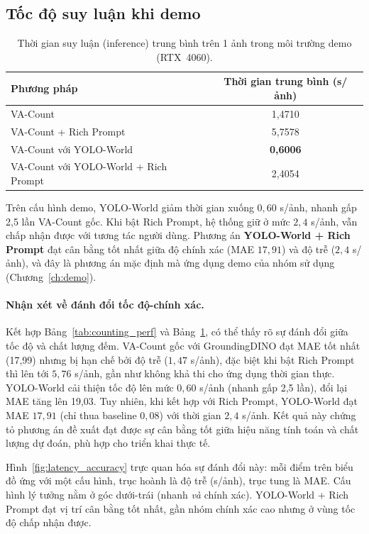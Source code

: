 \documentclass[a4paper,12pt]{report}
\numberwithin{figure}{chapter}
\numberwithin{table}{chapter}
\begin{document}
\subsection{Tốc độ suy luận khi demo}

\begin{table}[H]
\centering
\renewcommand{\arraystretch}{1.2}
\begin{tabular}{|l|c|}
\hline
\rowcolor[HTML]{EFEFEF}
\textbf{Phương pháp} & \textbf{Thời gian trung bình (s/ảnh)} \\
\hline
VA-Count & 1,4710 \\
\hline
VA-Count + Rich Prompt & 5,7578 \\
\hline
VA-Count với YOLO-World & \textbf{0,6006} \\
\hline
VA-Count với YOLO-World + Rich Prompt & 2,4054 \\
\hline
\end{tabular}
\caption{Thời gian suy luận (inference) trung bình trên 1 ảnh trong môi trường demo (RTX~4060).}
\label{tab:demo_time}
\end{table}

Trên cấu hình demo, YOLO-World giảm thời gian xuống $0{,}60$ s/ảnh, nhanh gấp 2,5 lần VA-Count gốc. Khi bật Rich Prompt, hệ thống giữ ở mức $2{,}4$ s/ảnh, vẫn chấp nhận được với tương tác người dùng. Phương án \textbf{YOLO-World + Rich Prompt} đạt cân bằng tốt nhất giữa độ chính xác (MAE $17{,}91$) và độ trễ ($2{,}4$ s/ảnh), và đây là phương án mặc định mà ứng dụng demo của nhóm sử dụng (Chương~\ref{ch:demo}).

\paragraph{Nhận xét về đánh đổi tốc độ-chính xác.}
Kết hợp Bảng~\ref{tab:counting_perf} và Bảng~\ref{tab:demo_time}, có thể thấy rõ sự đánh đổi giữa tốc độ và chất lượng đếm. VA-Count gốc với GroundingDINO đạt MAE tốt nhất (17,99) nhưng bị hạn chế bởi độ trễ ($1{,}47$ s/ảnh), đặc biệt khi bật Rich Prompt thì lên tới $5{,}76$ s/ảnh, gần như không khả thi cho ứng dụng thời gian thực. YOLO-World cải thiện tốc độ lên mức $0{,}60$ s/ảnh (nhanh gấp 2,5 lần), đổi lại MAE tăng lên 19,03. Tuy nhiên, khi kết hợp với Rich Prompt, YOLO-World đạt MAE $17{,}91$ (chỉ thua baseline $0{,}08$) với thời gian $2{,}4$ s/ảnh. Kết quả này chứng tỏ phương án đề xuất đạt được sự cân bằng tốt giữa hiệu năng tính toán và chất lượng dự đoán, phù hợp cho triển khai thực tế.

Hình~\ref{fig:latency_accuracy} trực quan hóa sự đánh đổi này: mỗi điểm trên biểu đồ ứng với một cấu hình, trục hoành là độ trễ (s/ảnh), trục tung là MAE. Cấu hình lý tưởng nằm ở góc dưới-trái (nhanh \emph{và} chính xác). YOLO-World + Rich Prompt đạt vị trí cân bằng tốt nhất, gần nhóm chính xác cao nhưng ở vùng tốc độ chấp nhận được.
\end{document}
